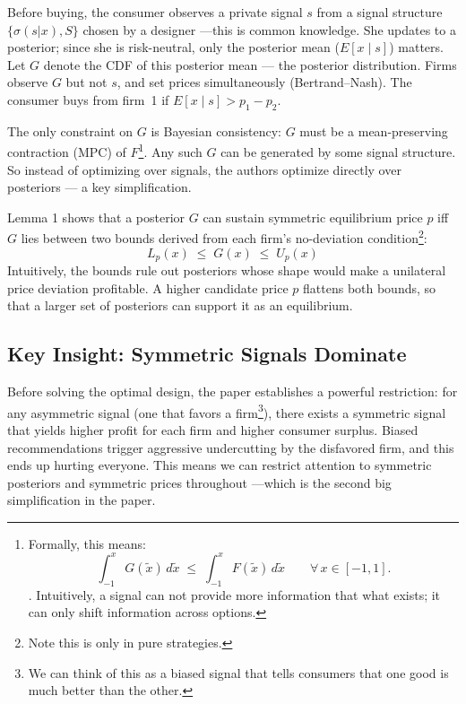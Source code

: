 \documentclass[12pt, a4paper]{article}
\begin{document}
Before buying, the consumer observes a private signal $s$ from a signal structure $\{\sigma(s|x), S\}$ chosen by a designer ---this is common knowledge. She updates to a posterior; since she is risk-neutral, only the posterior mean ($E[x \mid s]$) matters. Let $G$ denote the CDF of this posterior mean --- the posterior distribution. Firms observe $G$ but not $s$, and set prices simultaneously (Bertrand--Nash). The consumer buys from firm~1 if $E[x \mid s] > p_1 - p_2$.

The only constraint on $G$ is Bayesian consistency: $G$ must be a mean-preserving contraction (MPC) of $F$\footnote{Formally, this means: 
$$\int_{-1}^{x} G(\tilde{x})\,d\tilde{x} \;\leq\; \int_{-1}^{x} F(\tilde{x})\,d\tilde{x} \qquad \forall\, x \in [-1,1].$$ . Intuitively, a signal can not provide more information that what exists; it can only shift information across options.}.
Any such $G$ can be generated by some signal structure. So instead of optimizing over signals, the authors optimize directly over posteriors --- a key simplification.

Lemma 1 shows that a posterior $G$ can sustain symmetric equilibrium price $p$ iff $G$ lies between two bounds derived from each firm's no-deviation condition\footnote{Note this is only in pure strategies.}:
$$L_p(x) \;\leq\; G(x) \;\leq\; U_p(x)$$
Intuitively, the bounds rule out posteriors whose shape would make a unilateral price deviation profitable. A higher candidate price $p$ flattens both bounds, so that a larger set of posteriors can support it as an equilibrium.



\subsection{Key Insight: Symmetric Signals Dominate}

Before solving the optimal design, the paper establishes a powerful restriction: for any asymmetric signal (one that favors a firm\footnote{We can think of this as a biased signal that tells consumers that one good is much better than the other.}), there exists a symmetric signal that yields higher profit for each firm and higher consumer surplus. Biased recommendations trigger aggressive undercutting by the disfavored firm, and this ends up hurting everyone. This means we can restrict attention to symmetric posteriors and symmetric prices throughout ---which is the second big simplification in the paper.
\end{document}
